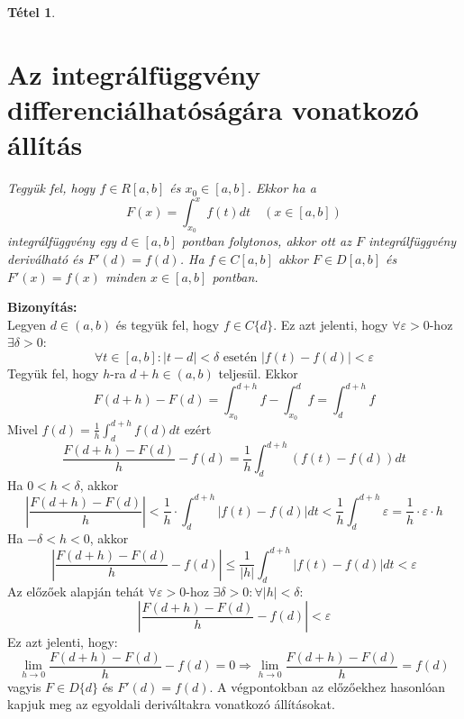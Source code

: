\documentclass{article}
\newtheorem{theorem}{Tétel}
\renewenvironment{proof}{\textbf{Bizonyítás:} \\}{\hfill}
\begin{document}
\newpage
\begin{theorem}
\section{Az integrálfüggvény differenciálhatóságára vonatkozó állítás}
Tegyük fel, hogy $f\in R[a,b]$ és $x_0 \in [a,b]$. Ekkor ha a
\begin{equation*}
    F(x)=\int_{x_0}^xf(t)dt\quad (x\in [a,b])
\end{equation*}
integrálfüggvény egy $d\in [a,b]$ pontban folytonos, akkor ott az $F$ integrálfüggvény deriválható és $F'(d)=f(d)$. Ha $f \in C[a,b]$ akkor $F\in D[a,b]$ és $F'(x)=f(x)$ minden $x\in [a,b]$ pontban.
\end{theorem}
\begin{proof}
Legyen $d\in (a,b)$ és tegyük fel, hogy $f\in C\{d\}$. Ez azt jelenti, hogy $\forall \varepsilon > 0$-hoz $\exists \delta > 0$:
\begin{equation*}
    \forall t \in [a,b]: |t-d| < \delta\textrm{ esetén }|f(t)-f(d)|< \varepsilon
\end{equation*}
Tegyük fel, hogy $h$-ra $d+h\in (a,b)$ teljesül. Ekkor
\begin{equation*}
    F(d+h)-F(d)=\int_{x_0}^{d+h}f-\int_{x_0}^df=\int_d^{d+h}f
\end{equation*}
Mivel $f(d)=\frac{1}{h}\int_d^{d+h}f(d)dt$ ezért
\begin{equation*}
    \frac{F(d+h)-F(d)}{h}-f(d)=\frac{1}{h}\int_d^{d+h}(f(t)-f(d))dt
\end{equation*}
Ha $0<h<\delta$, akkor
\begin{equation*}
    \left|\frac{F(d+h)-F(d)}{h}\right|<\frac{1}{h}\cdot\int_d^{d+h}|f(t)-f(d)|dt <\frac{1}{h}\int_d^{d+h}\varepsilon=\frac{1}{h}\cdot \varepsilon\cdot h
\end{equation*}
Ha $-\delta<h<0$, akkor
\begin{equation*}
    \left|\frac{F(d+h)-F(d)}{h}-f(d)\right|\leq\frac{1}{|h|}\int_d^{d+h}|f(t)-f(d)|dt < \varepsilon
\end{equation*}
Az előzőek alapján tehát $\forall \varepsilon > 0$-hoz $\exists\delta > 0: \forall|h| < \delta$:
\begin{equation*}
    \left|\frac{F(d+h)-F(d)}{h}-f(d)\right|< \varepsilon
\end{equation*}
Ez azt jelenti, hogy:
\begin{equation*}
    \lim_{h\to 0}\frac{F(d+h)-F(d)}{h}-f(d)=0\Longrightarrow \lim_{h\to 0}\frac{F(d+h)-F(d)}{h}=f(d)
\end{equation*}
vagyis $F\in D\{d\}$ és $F'(d)=f(d)$. A végpontokban az előzőekhez hasonlóan kapjuk meg az egyoldali deriváltakra vonatkozó állításokat.
\end{proof}
\end{document}
